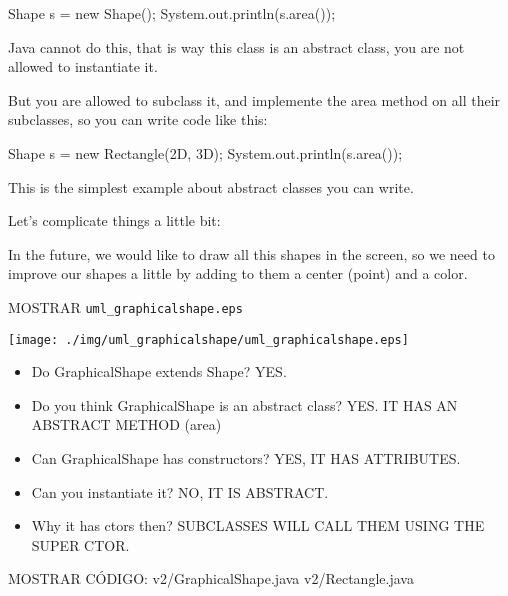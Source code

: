 \documentclass[a4paper, 9pt]{extarticle}
\begin{document}
\begin{blackboard}
  Shape s = new Shape();
  System.out.println(s.area());
\end{blackboard}

Java cannot do this, that is way this class is an abstract class, you are not
allowed to instantiate it.

But you are allowed to subclass it, and implemente the area method on all their subclasses, so you can write code like this:

\begin{blackboard}
  Shape s = new Rectangle(2D, 3D);
  System.out.println(s.area());
\end{blackboard}



This is the simplest example about abstract classes you can write.

Let's complicate things a little bit:

In the future, we would like to draw all this shapes in the screen, so we need
to improve our shapes a little by adding to them a center (point) and a color.

MOSTRAR \verb+uml_graphicalshape.eps+
\begin{center}
  \texttt{[image: ./img/uml\_graphicalshape/uml\_graphicalshape.eps]}
\end{center}

\begin{itemize}

  \item Do GraphicalShape extends Shape? YES.

  \item Do you think GraphicalShape is an abstract class? YES. IT HAS AN ABSTRACT METHOD (area)

  \item Can GraphicalShape has constructors? YES, IT HAS ATTRIBUTES.

  \item Can you instantiate it? NO, IT IS ABSTRACT.

  \item Why it has ctors then? SUBCLASSES WILL CALL THEM USING THE SUPER CTOR.

\end{itemize}

\begin{blackboard}
MOSTRAR CÓDIGO:
  v2/GraphicalShape.java
  v2/Rectangle.java
\end{blackboard}
\end{document}
